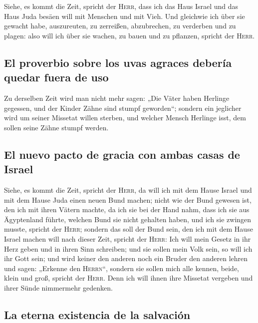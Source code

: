  Siehe, es kommt die Zeit, spricht der \textsc{Herr},
dass ich das Haus Israel und das Haus Juda besäen will mit Menschen und
mit Vieh.  Und gleichwie ich über sie gewacht habe,
auszureuten, zu zerreißen, abzubrechen, zu verderben und zu plagen: also
will ich über sie wachen, zu bauen und zu pflanzen, spricht der
\textsc{Herr}.

\hypertarget{el-proverbio-sobre-los-uvas-agraces-deberuxeda-quedar-fuera-de-uso}{%
\subsection{El proverbio sobre los uvas agraces debería quedar fuera de
uso}\label{el-proverbio-sobre-los-uvas-agraces-deberuxeda-quedar-fuera-de-uso}}

 Zu derselben Zeit wird man nicht mehr sagen: „Die Väter
haben Herlinge gegessen, und der Kinder Zähne sind stumpf geworden``;
 sondern ein jeglicher wird um seiner Missetat willen
sterben, und welcher Mensch Herlinge isst, dem sollen seine Zähne stumpf
werden.

\hypertarget{el-nuevo-pacto-de-gracia-con-ambas-casas-de-israel}{%
\subsection{El nuevo pacto de gracia con ambas casas de
Israel}\label{el-nuevo-pacto-de-gracia-con-ambas-casas-de-israel}}

 Siehe, es kommt die Zeit, spricht der \textsc{Herr}, da
will ich mit dem Hause Israel und mit dem Hause Juda einen neuen Bund
machen;  nicht wie der Bund gewesen ist, den ich mit
ihren Vätern machte, da ich sie bei der Hand nahm, dass ich sie aus
Ägyptenland führte, welchen Bund sie nicht gehalten haben, und ich sie
zwingen musste, spricht der \textsc{Herr};  sondern das
soll der Bund sein, den ich mit dem Hause Israel machen will nach dieser
Zeit, spricht der \textsc{Herr}: Ich will mein Gesetz in ihr Herz geben
und in ihren Sinn schreiben; und sie sollen mein Volk sein, so will ich
ihr Gott sein;  und wird keiner den anderen noch ein
Bruder den anderen lehren und sagen: „Erkenne den \textsc{Herrn}``,
sondern sie sollen mich alle kennen, beide, klein und groß, spricht der
\textsc{Herr}. Denn ich will ihnen ihre Missetat vergeben und ihrer
Sünde nimmermehr gedenken.

\hypertarget{la-eterna-existencia-de-la-salvaciuxf3n}{%
\subsection{La eterna existencia de la
salvación}\label{la-eterna-existencia-de-la-salvaciuxf3n}}

